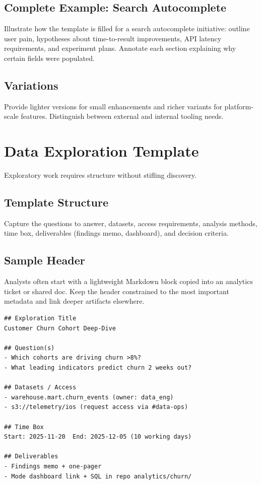 \subsection{Complete Example: Search Autocomplete}
Illustrate how the template is filled for a search autocomplete initiative: outline user pain, hypotheses about time-to-result improvements, API latency requirements, and experiment plans. Annotate each section explaining why certain fields were populated.

\subsection{Variations}
Provide lighter versions for small enhancements and richer variants for platform-scale features. Distinguish between external and internal tooling needs.

\section{Data Exploration Template}
\label{sec:exploration-template}

Exploratory work requires structure without stifling discovery.

\subsection{Template Structure}
Capture the questions to answer, datasets, access requirements, analysis methods, time box, deliverables (findings memo, dashboard), and decision criteria.

\subsection{Sample Header}
Analysts often start with a lightweight Markdown block copied into an analytics ticket or shared doc. Keep the header constrained to the most important metadata and link deeper artifacts elsewhere.

\begin{verbatim}
## Exploration Title
Customer Churn Cohort Deep-Dive

## Question(s)
- Which cohorts are driving churn >8%?
- What leading indicators predict churn 2 weeks out?

## Datasets / Access
- warehouse.mart.churn_events (owner: data_eng)
- s3://telemetry/ios (request access via #data-ops)

## Time Box
Start: 2025-11-20  End: 2025-12-05 (10 working days)

## Deliverables
- Findings memo + one-pager
- Mode dashboard link + SQL in repo analytics/churn/
\end{verbatim}

